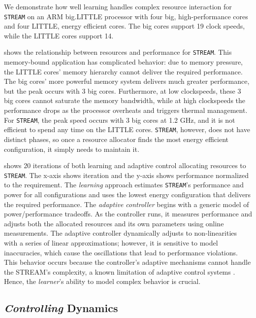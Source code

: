We demonstrate how well learning handles complex resource interaction
for \texttt{STREAM} on an ARM big.LITTLE processor with four big,
high-performance cores and four LITTLE, energy efficient cores.  The
big cores support 19 clock speeds, while the LITTLE cores support 14.


 shows the relationship between resources
and performance for \texttt{STREAM}.  This memory-bound application
has complicated behavior: due to memory pressure, the LITTLE cores'
memory hierarchy cannot deliver the required performance.  The big
cores' more powerful memory system delivers much greater performance,
but the peak occurs with 3 big cores.  Furthermore, at low
clockspeeds, these 3 big cores cannot saturate the memory bandwidth,
while at high clockspeeds the performance drops as the processor
overheats and triggers thermal management.  For \texttt{STREAM}, the
peak speed occurs with 3 big cores at 1.2 GHz, and it is not efficient
to spend any time on the LITTLE cores.  \texttt{STREAM}, however, does
not have distinct phases, so once a resource allocator finds the most
energy efficient configuration, it simply needs to maintain it.


 shows 20 iterations of both learning
\cite{LEO} and adaptive control \cite{POET} allocating resources to
\texttt{STREAM}.  The x-axis shows iteration and the y-axis shows
performance normalized to the requirement.  The \emph{learning}
approach estimates \texttt{STREAM}'s performance and power for all
configurations and uses the lowest energy configuration that delivers
the required performance.  The \emph{adaptive controller} begins with
a generic model of power/performance tradeoffs.  As the controller
runs, it measures performance and adjusts both the allocated resources
and its own parameters using online measurements.  The adaptive
controller dynamically adjusts to non-linearities with a series of
linear approximations; however, it is sensitive to model inaccuracies,
which cause the oscillations that lead to performance violations.
This behavior occurs because the controller's adaptive mechanisms
cannot handle the STREAM's complexity, a known limitation of adaptive
control systems \cite{ControlWare,POET,ICSE2014}.  Hence, the
\emph{learner}'s ability to model complex behavior is crucial.

\subsection{\emph{Controlling} Dynamics}

